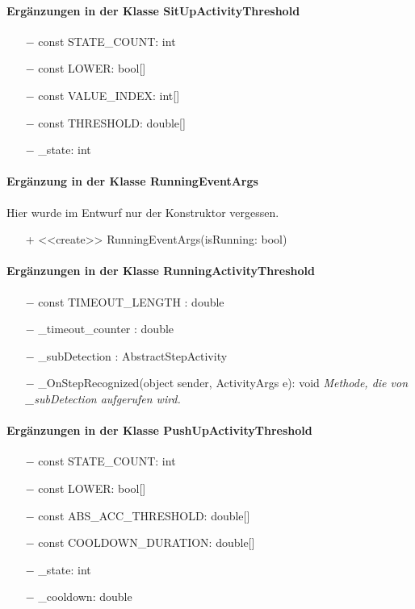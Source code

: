 \documentclass[a4paper,12pt]{article}
\begin{document}
\paragraph{Ergänzungen in der Klasse SitUpActivityThreshold}
\begin{itemize}
	\item [$-$] const STATE\_COUNT: int
	\item [$-$] const LOWER: bool[]
	\item [$-$] const VALUE\_INDEX: int[]
	\item [$-$] const THRESHOLD: double[]
	\item [$-$] \_state: int
\end{itemize}
\paragraph{Ergänzung in der Klasse RunningEventArgs}
Hier wurde im Entwurf nur der Konstruktor vergessen.
\begin{itemize}
	\item [+] <<create>> RunningEventArgs(isRunning: bool)
\end{itemize}
\paragraph{Ergänzungen in der Klasse RunningActivityThreshold}
\begin{itemize}
	\item [$-$] const TIMEOUT\_LENGTH : double
	\item [$-$] \_timeout\_counter : double
	\item [$-$] \_subDetection : AbstractStepActivity
	\item [$-$] \_OnStepRecognized(object sender, ActivityArgs e): void \textit{Methode, die von \_subDetection aufgerufen wird.}
\end{itemize}
\paragraph{Ergänzungen in der Klasse PushUpActivityThreshold}
\begin{itemize}
	\item [$-$] const STATE\_COUNT: int
	\item [$-$] const LOWER: bool[]
	\item [$-$] const ABS\_ACC\_THRESHOLD: double[]
	\item [$-$] const COOLDOWN\_DURATION: double[]
	\item [$-$] \_state: int
	\item [$-$] \_cooldown: double
	
\end{itemize}
\end{document}
